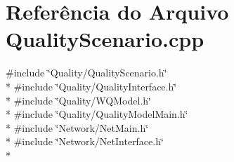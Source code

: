 \section{Referência do Arquivo Quality\+Scenario.\+cpp}
\label{_quality_scenario_8cpp}
{\ttfamily \#include \char`\"{}Quality/\+Quality\+Scenario.\+h\char`\"{}}\\*
{\ttfamily \#include \char`\"{}Quality/\+Quality\+Interface.\+h\char`\"{}}\\*
{\ttfamily \#include \char`\"{}Quality/\+W\+Q\+Model.\+h\char`\"{}}\\*
{\ttfamily \#include \char`\"{}Quality/\+Quality\+Model\+Main.\+h\char`\"{}}\\*
{\ttfamily \#include \char`\"{}Network/\+Net\+Main.\+h\char`\"{}}\\*
{\ttfamily \#include \char`\"{}Network/\+Net\+Interface.\+h\char`\"{}}\\*
